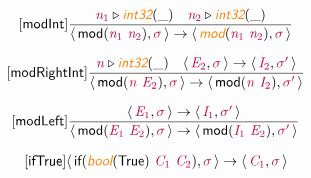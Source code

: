 \documentclass[10pt,leqno,fleqn]{article}
\newcommand{\artVariable}[1]{\mbox{\color{purple}\em #1\/}}
\newcommand{\artConstructor}[1]{\mbox{\sf #1}}
\newcommand{\artSpecial}[1]{\mbox{\color{orange}\sf\em #1}}
\begin{document}
\begin{equation}
\tag*{[\artConstructor{\sf modInt}]}
\begin{split}\frac{ \artVariable{n$_{1}$}\triangleright \artSpecial{int32}(\_) \quad  \artVariable{n$_{2}$}\triangleright \artSpecial{int32}(\_) }{\langle\, \artConstructor{\sf mod}(\artVariable{n$_{1}$}\ \artVariable{n$_{2}$}), \artVariable{$\sigma$}\,\rangle \rightarrow \langle\, \artSpecial{mod}(\artVariable{n$_{1}$}\ \artVariable{n$_{2}$}), \artVariable{$\sigma$}\,\rangle }
\end{split}
\end{equation}

\begin{equation}
\tag*{[\artConstructor{\sf modRightInt}]}
\begin{split}\frac{ \artVariable{n}\triangleright \artSpecial{int32}(\_) \quad \langle\, \artVariable{E$_{2}$}, \artVariable{$\sigma$}\,\rangle \rightarrow \langle\, \artVariable{I$_{2}$}, \artVariable{$\sigma$\/$^\prime$}\,\rangle }{\langle\, \artConstructor{\sf mod}(\artVariable{n}\ \artVariable{E$_{2}$}), \artVariable{$\sigma$}\,\rangle \rightarrow \langle\, \artConstructor{\sf mod}(\artVariable{n}\ \artVariable{I$_{2}$}), \artVariable{$\sigma$\/$^\prime$}\,\rangle }
\end{split}
\end{equation}

\begin{equation}
\tag*{[\artConstructor{\sf modLeft}]}
\begin{split}\frac{\langle\, \artVariable{E$_{1}$}, \artVariable{$\sigma$}\,\rangle \rightarrow \langle\, \artVariable{I$_{1}$}, \artVariable{$\sigma$\/$^\prime$}\,\rangle }{\langle\, \artConstructor{\sf mod}(\artVariable{E$_{1}$}\ \artVariable{E$_{2}$}), \artVariable{$\sigma$}\,\rangle \rightarrow \langle\, \artConstructor{\sf mod}(\artVariable{I$_{1}$}\ \artVariable{E$_{2}$}), \artVariable{$\sigma$\/$^\prime$}\,\rangle }
\end{split}
\end{equation}

\begin{equation}
\tag*{[\artConstructor{\sf ifTrue}]}
\begin{split}\langle\, \artConstructor{\sf if}(\artSpecial{bool}(\artConstructor{\sf True})\ \artVariable{C$_{1}$}\ \artVariable{C$_{2}$}), \artVariable{$\sigma$}\,\rangle \rightarrow \langle\, \artVariable{C$_{1}$}, \artVariable{$\sigma$}\,\rangle 
\end{split}
\end{equation}
\end{document}
